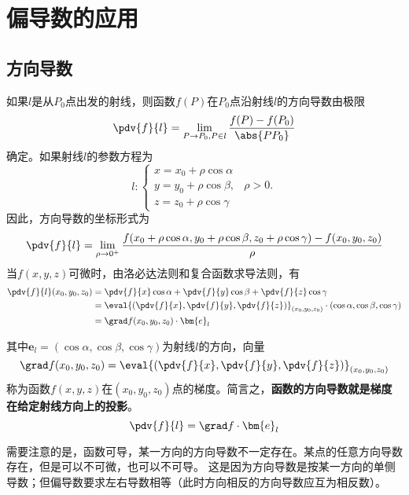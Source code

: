 \section{偏导数的应用}
\subsection{方向导数}
如果$l$是从$P_0$点出发的射线，则函数$f(P)$在$P_0$点沿射线$l$的方向导数由极限
\begin{equation}
    \pdv{f}{l} = \lim_{P\to P_0,P\in l}\frac{f(P)-f(P_0)}{\abs{PP_0}}
\end{equation}
确定。如果射线$l$的参数方程为
\[
    l:
    \begin{cases}
        x = x_0 + \rho\cos\alpha &          \\
        y = y_0 + \rho\cos\beta, & \rho >0. \\
        z = z_0 + \rho\cos\gamma &
    \end{cases}
\]
因此，方向导数的坐标形式为
\begin{equation}
    \pdv{f}{l} = \lim_{\rho\to 0^+}\frac{f(x_0 + \rho\cos\alpha,y_0 + \rho\cos\beta,z_0 + \rho\cos\gamma)-f(x_0,y_0,z_0)}{\rho}
\end{equation}
当$f(x,y,z)$可微时，由洛必达法则和复合函数求导法则，有
\begin{align*}
    \pdv{f}{l}(x_0,y_0,z_0)
     & = \pdv{f}{x}\cos\alpha + \pdv{f}{y}\cos\beta + \pdv{f}{z}\cos\gamma                                          \\
     & = \eval{\left(\pdv{f}{x},\pdv{f}{y},\pdv{f}{z}\right)}_{(x_0,y_0,z_0)}\cdot(\cos\alpha,\cos\beta,\cos\gamma) \\
     & = \grad f(x_0,y_0,z_0)\cdot \bm{e}_l
\end{align*}

其中$\bm{e}_l=(\cos\alpha,\cos\beta,\cos\gamma)$为射线$l$的方向，向量
\begin{equation}
    \grad f(x_0,y_0,z_0)=\eval{\left(\pdv{f}{x},\pdv{f}{y},\pdv{f}{z}\right)}_{(x_0,y_0,z_0)}
\end{equation}
称为函数$f(x,y,z)$在$(x_0,y_0,z_0)$点的梯度。简言之，\textbf{\textsf{函数的方向导数就是梯度在给定射线方向上的投影}}。
\begin{equation}
    \pdv{f}{l} = \grad f\cdot \bm{e}_l
\end{equation}

需要注意的是，函数可导，某一方向的方向导数不一定存在。某点的任意方向导数存在，但是可以不可微，也可以不可导。
这是因为方向导数是按某一方向的单侧导数；但偏导数要求左右导数相等（此时方向相反的方向导数应互为相反数）。


